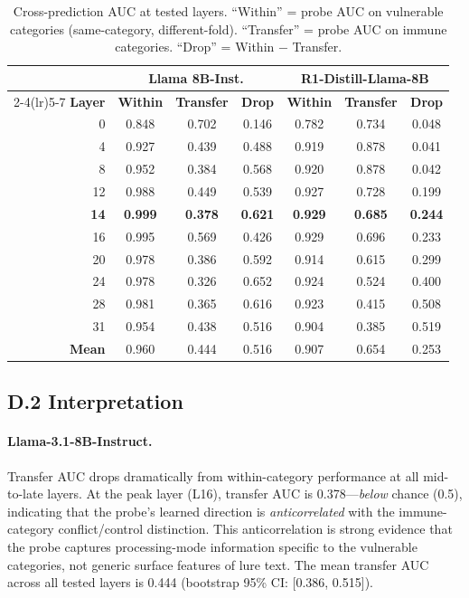 \documentclass[accepted]{article}
\begin{document}
\begin{table}[ht]
\centering
\caption{Cross-prediction AUC at tested layers.  ``Within'' = probe
  AUC on vulnerable categories (same-category, different-fold).
  ``Transfer'' = probe AUC on immune categories.  ``Drop'' =
  Within $-$ Transfer.}
\label{tab:cross_pred_full}
\vspace{4pt}
\small
\begin{tabular}{rcccccc}
\toprule
& \multicolumn{3}{c}{\textbf{Llama 8B-Inst.}} & \multicolumn{3}{c}{\textbf{R1-Distill-Llama-8B}} \\
\cmidrule(lr){2-4}\cmidrule(lr){5-7}
\textbf{Layer} & \textbf{Within} & \textbf{Transfer} & \textbf{Drop} & \textbf{Within} & \textbf{Transfer} & \textbf{Drop} \\
\midrule
 0 & 0.848 & 0.702 & 0.146 & 0.782 & 0.734 & 0.048 \\
 4 & 0.927 & 0.439 & 0.488 & 0.919 & 0.878 & 0.041 \\
 8 & 0.952 & 0.384 & 0.568 & 0.920 & 0.878 & 0.042 \\
12 & 0.988 & 0.449 & 0.539 & 0.927 & 0.728 & 0.199 \\
\textbf{14} & \textbf{0.999} & \textbf{0.378} & \textbf{0.621} & \textbf{0.929} & \textbf{0.685} & \textbf{0.244} \\
16 & 0.995 & 0.569 & 0.426 & 0.929 & 0.696 & 0.233 \\
20 & 0.978 & 0.386 & 0.592 & 0.914 & 0.615 & 0.299 \\
24 & 0.978 & 0.326 & 0.652 & 0.924 & 0.524 & 0.400 \\
28 & 0.981 & 0.365 & 0.616 & 0.923 & 0.415 & 0.508 \\
31 & 0.954 & 0.438 & 0.516 & 0.904 & 0.385 & 0.519 \\
\midrule
\textbf{Mean} & 0.960 & 0.444 & 0.516 & 0.907 & 0.654 & 0.253 \\
\bottomrule
\end{tabular}
\end{table}

\subsection*{D.2 Interpretation}

\paragraph{Llama-3.1-8B-Instruct.}
Transfer AUC drops dramatically from within-category performance at
all mid-to-late layers.  At the peak layer (L16), transfer AUC is
0.378---\emph{below} chance (0.5), indicating that the probe's
learned direction is \emph{anticorrelated} with the immune-category
conflict/control distinction.  This anticorrelation is strong
evidence that the probe captures processing-mode information specific
to the vulnerable categories, not generic surface features of lure
text.  The mean transfer AUC across all tested layers is 0.444
(bootstrap 95\% CI: [0.386, 0.515]).
\end{document}
